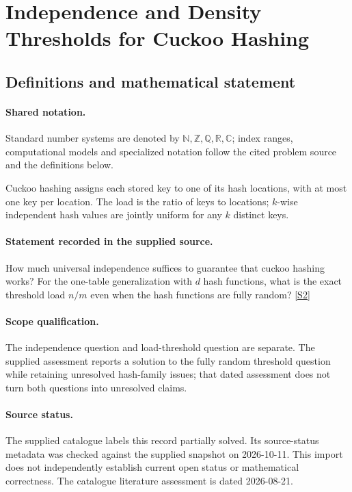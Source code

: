 \documentclass[11pt]{article}
\newcommand{\sref}[2]{\hyperlink{source:#1:#2}{[S#2]}}
\begin{document}
\section{Independence and Density Thresholds for Cuckoo Hashing}\label{statement}

\subsection{Definitions and mathematical statement}

\paragraph{Shared notation.}Standard number systems are denoted by $\mathbb N,\mathbb Z,\mathbb Q,\mathbb R,\mathbb C$; index ranges, computational models and specialized notation follow the cited problem source and the definitions below.


Cuckoo hashing assigns each stored key to one of its hash locations, with at most one key per location. The load is the ratio of keys to locations; $k$-wise independent hash values are jointly uniform for any $k$ distinct keys.
\paragraph{Statement recorded in the supplied source.}
How much universal independence suffices to guarantee that cuckoo hashing works? For the one-table generalization with $d$ hash functions, what is the exact threshold load $n/m$ even when the hash functions are fully random? \sref{statement}{2}
\paragraph{Scope qualification.}
The independence question and load-threshold question are separate. The supplied assessment reports a solution to the fully random threshold question while retaining unresolved hash-family issues; that dated assessment does not turn both questions into unresolved claims.
\paragraph{Source status.}
The supplied catalogue labels this record partially solved. Its source-status metadata was checked against the supplied snapshot on 2026-10-11. This import does not independently establish current open status or mathematical correctness. The catalogue literature assessment is dated 2026-08-21.
\end{document}
